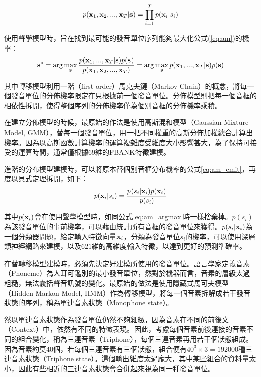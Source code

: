 \begin{equation}\label{eq:am_emit}
p( \bold{x}_1 , \bold{x}_2 , ... , \bold{x}_T | \bold{s} ) = \prod_{i = 1}^{T} p( \bold{x}_i | s_i )
\end{equation}

使用聲學模型時，旨在找到最可能的發音單位序列能夠最大化公式(\ref{eq:am})的機率：
\begin{equation}\label{eq:am_argmax}
 \bold{s}^* =  \arg\max_{\bold{s} } \frac{ p( \bold{x}_1 , ... , \bold{x}_T | \bold{s} ) p( \bold{s} ) } { p( \bold{x}_1 , \bold{x}_2 , ... , \bold{x}_T ) } = \arg\max_{\bold{s} }  p( \bold{x}_1 , ... , \bold{x}_T  | \bold{s} ) p( \bold{s} ) 
\end{equation}

其中轉移模型利用一階（first order）馬克夫鏈（Markov Chain）的概念，將每一個發音單位的分佈機率限定在只根據前一個發音單位。分佈模型則把每一個音框的相依性拆開，使得整個序列的分佈機率僅為個別音框的分佈機率乘積。

在建立分佈模型的時候，最原始的作法是使用高斯混和模型（Gaussian Mixture Model, GMM），替每一個發音單位，用一把不同權重的高斯分佈加權總合計算出機率。因為以高斯函數計算機率的運算複雜度受維度大小影響甚大，為了保持可接受的運算時間，通常僅根據69維的FBANK特徵建模。

進階的分布模型建模時，可以將原本替個別音框分布機率的公式\ref{eq:am_emit}，再度以貝式定理拆開，如下：
\begin{equation}\label{eq:am_emit_framewise}
p( \bold{x}_i | s_i ) = \frac{ p( s_i | \bold{x}_i) p( \bold{x}_i ) } { p ( s_i )}
\end{equation}

其中$p(\bold{x}_i )$會在使用聲學模型時，如同公式\ref{eq:am_argmax}時一樣捨棄掉。$p( s_i )$為該發音單位的事前機率，可以藉由統計所有音框的發音單位來獲得。$p( s_i | \bold{x}_i )$為一個分類器問題，給定輸入特徵向量$\bold{x}_i$，分類為發音單位$s_i$的機率，可以使用深層類神經網路來建模，以及$621$維的高維度輸入特徵，以達到更好的預測準確率。

在替轉移模型建模時，必須先決定好建模所使用的發音單位。語言學家定義音素（Phoneme）為人耳可鑑別的最小發音單位，然對於機器而言，音素的層級太過粗糙，無法囊括聲音訊號的變化。最原始的做法是使用隱藏式馬可夫模型（Hidden Markon Model, HMM）作為轉移模型，將每一個音素拆解成若干發音狀態的序列，稱為單連音素狀態（Monophone state）。

然以單連音素狀態作為發音單位仍然不夠細緻，因為音素在不同的前後文（Context）中，依然有不同的特徵表現。因此，考慮每個音素前後連接的音素不同的組合變化，稱為三連音素（Triphone），每個三連音素再用若干個狀態組成。因為音素約莫40個，若每個三連音素有三個狀態，組合便有$40^3 \times 3= 192000$種三連音素狀態（Triphone state）。這個輸出維度太過龐大，其中某些組合的資料量太小，因此有些相近的三連音素狀態會合併起來視為同一種發音單位。

